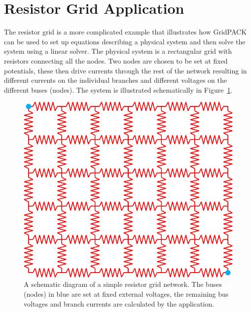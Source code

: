 \section{Resistor Grid Application}

The resistor grid is a more complicated example that illustrates how GridPACK
can be used to set up equations describing a physical system and then solve the
system using a linear solver. The physical system is a rectangular grid with
resistors connecting all the nodes. Two nodes are chosen to be set at fixed
potentials, these then drive currents through the rest of the network resulting
in different currents on the individual branches and different voltages on the
different buses (nodes). The system is illustrated schematically in
Figure~\ref{fig:resistor}.

\begin{figure}
  \centering
    \includegraphics*[width=5in, keepaspectratio=true]{figures/Resistor}
  \caption{A schematic diagram of a simple resistor grid network. The buses (nodes) in blue are set at fixed external voltages, the remaining bus voltages and branch currents are calculated by the application.}
  \label{fig:resistor}
\end{figure}




